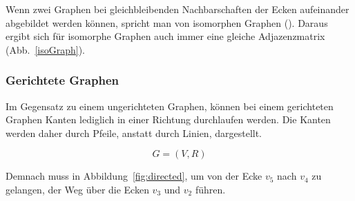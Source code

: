 Wenn zwei Graphen bei gleichbleibenden Nachbarschaften der Ecken aufeinander abgebildet werden können, spricht man von isomorphen Graphen (\cite[106]{theory}).
Daraus ergibt sich für isomorphe Graphen auch immer eine gleiche Adjazenzmatrix (Abb.~\ref{isoGraph}).


\subsubsection{Gerichtete Graphen}
Im Gegensatz zu einem ungerichteten Graphen, können bei einem gerichteten Graphen Kanten lediglich in einer Richtung durchlaufen werden.
Die Kanten werden daher durch Pfeile, anstatt durch Linien, dargestellt.

$$G = (V,R)$$

Demnach muss in Abbildung~\ref{fig:directed}, um von der Ecke $v_{5}$ nach $v_{4}$ zu gelangen, der Weg über die Ecken $v_{3}$ und $v_{2}$ führen.

